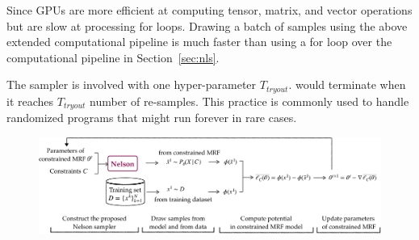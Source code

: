 {Since GPUs are more efficient at computing tensor, matrix, and vector operations but are slow at processing for loops. Drawing a batch of samples using the above extended computational pipeline is much faster than using a for loop over the computational pipeline in Section~\ref{sec:nls}.}

The sampler is involved with one hyper-parameter $T_{\textit{tryout}}$. \nls  would terminate when it reaches $T_{\textit{tryout}}$ number of re-samples. This practice is commonly used to handle randomized programs that might run forever in rare cases. 

\begin{figure}[!t]
\centering
\includegraphics[width=0.99\linewidth]{figs/learn-pipeline-crop.pdf}
\label{fig:pipeline}
\end{figure}



